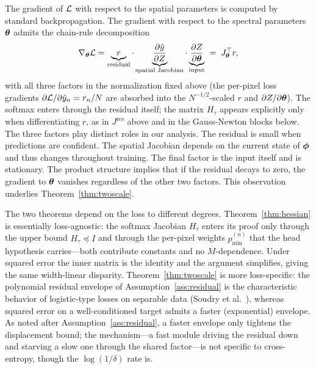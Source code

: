 The gradient of $\mathcal{L}$ with respect to the spatial parameters is
computed by standard backpropagation. The gradient with respect to the
spectral parameters ${\boldsymbol{\theta}}$ admits the chain-rule decomposition
\begin{equation}
\label{eq:chain}
    \nabla_{\boldsymbol{\theta}} \mathcal{L}
    = \underbrace{r}_{\text{residual}}
    \cdot \underbrace{\frac{\partial \hat{y}}{\partial Z}}_{\text{spatial Jacobian}}
    \cdot \underbrace{\frac{\partial Z}{\partial {\boldsymbol{\theta}}}}_{\text{input}}
    \;=\; J_{\boldsymbol{\theta}}^\top r ,
\end{equation}
with all three factors in the normalization fixed above (the
per-pixel loss gradients $\partial \mathcal{L} / \partial \hat{y}_n =
r_n / N$ are absorbed into the $N^{-1/2}$-scaled $r$ and
$\partial Z / \partial {\boldsymbol{\theta}}$). The softmax enters through the
residual itself; the matrix $H_\tau$ appears explicitly only when
differentiating $r$, as in $J^{\mathrm{res}}$ above and in the
Gauss-Newton blocks below.
The three factors play distinct roles in our analysis. The residual is
small when predictions are confident. The spatial Jacobian depends on
the current state of ${\boldsymbol{\phi}}$ and thus changes throughout training. The
final factor is the input itself and is stationary. The product
structure implies that if the residual decays to zero, the gradient to
${\boldsymbol{\theta}}$ vanishes regardless of the other two factors. This
observation underlies Theorem~\ref{thm:twoscale}.

\begin{remark}
\label{rem:loss_scope}
The two theorems depend on the loss to different degrees.
Theorem~\ref{thm:hessian} is essentially loss-agnostic: the softmax
Jacobian $H_\tau$ enters its proof only through the upper bound
$H_\tau \preceq I$ and through the per-pixel weights
$p^{(n)}_{\min}$ that the head hypothesis carries---both contribute
constants and no $M$-dependence. Under squared error the inner matrix is the
identity and the argument simplifies, giving the same width-linear
disparity. Theorem~\ref{thm:twoscale} is more loss-specific: the
polynomial residual envelope of Assumption~\ref{ass:residual} is the
characteristic behavior of logistic-type losses on separable data
(Soudry et al.~\cite{soudry2018implicit}), whereas squared error on a
well-conditioned target admits a faster (exponential) envelope. As
noted after Assumption~\ref{ass:residual}, a faster envelope only
tightens the displacement bound; the mechanism---a fast module
driving the residual down and starving a slow one through the shared
factor---is not specific to cross-entropy, though the $\log(1/\delta)$
rate is.
\end{remark}

